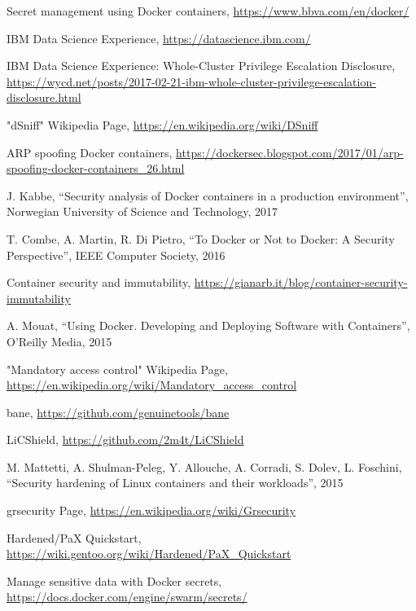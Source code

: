 \documentclass[a4paper,12pt]{article}
\begin{document}
\begin{thebibliography}{99}
Secret management using Docker containers, \url{https://www.bbva.com/en/docker/}

IBM Data Science Experience, \url{https://datascience.ibm.com/}

IBM Data Science Experience: Whole-Cluster Privilege Escalation Disclosure,
\url{https://wycd.net/posts/2017-02-21-ibm-whole-cluster-privilege-escalation-disclosure.html}

"dSniff" Wikipedia Page, \url{https://en.wikipedia.org/wiki/DSniff}

ARP spoofing Docker containers,
\url{https://dockersec.blogspot.com/2017/01/arp-spoofing-docker-containers_26.html}

J. Kabbe, ``Security analysis of Docker containers in
a production environment'', Norwegian University of Science and Technology, 2017

T. Combe, A. Martin, R. Di Pietro, ``To Docker or Not to Docker: A Security
Perspective'', IEEE Computer Society, 2016

Container security and immutability,
\url{https://gianarb.it/blog/container-security-immutability}

A. Mouat, ``Using Docker. Developing and Deploying Software with Containers'',
O'Reilly Media, 2015

"Mandatory access control" Wikipedia Page,
\url{https://en.wikipedia.org/wiki/Mandatory_access_control}

bane, \url{https://github.com/genuinetools/bane}

LiCShield, \url{https://github.com/2m4t/LiCShield}

M. Mattetti, A. Shulman-Peleg, Y. Allouche, A. Corradi, S. Dolev, L. Foschini,
``Security hardening of Linux containers and their workloads'', 2015

grsecurity Page, \url{https://en.wikipedia.org/wiki/Grsecurity}


Hardened/PaX Quickstart,
\url{https://wiki.gentoo.org/wiki/Hardened/PaX_Quickstart}

Manage sensitive data with Docker secrets,
\url{https://docs.docker.com/engine/swarm/secrets/}


\end{thebibliography}
\end{document}
